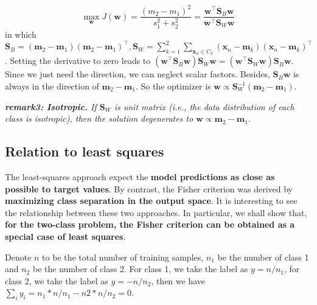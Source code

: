 \documentclass{article}
\begin{document}
	
	\begin{equation}
	\max_\mathbf{w} J(\mathbf{w}) = \frac{(m_2-m_1)^2}{s_1^2+s_2^2} 
	= \frac{\mathbf{w}^\top \mathbf{S}_B \mathbf{w}}{\mathbf{w}^\top \mathbf{S}_W \mathbf{w}}
	\end{equation}
in which $\mathbf{S}_B=(\mathbf{m}_2-\mathbf{m}_1)(\mathbf{m}_2-\mathbf{m}_1)^\top, \mathbf{S}_W=\sum_{k=1}^2\sum_{\mathbf{x}_n\in C_k}(\mathbf{x}_n-\mathbf{m}_k)(\mathbf{x}_n-\mathbf{m}_k)^\top$. Setting the derivative to zero leads to $(\mathbf{w}^\top \mathbf{S}_B \mathbf{w}) \mathbf{S}_W \mathbf{w} = (\mathbf{w}^\top \mathbf{S}_W \mathbf{w}) \mathbf{S}_B \mathbf{w}$. Since we just need the direction, we can neglect scalar factors. Besides,  $\mathbf{S}_B \mathbf{w}$ is always in the direction of $\mathbf{m}_2 - \mathbf{m}_1$. So the optimizer is $\mathbf{w}\propto \mathbf{S}_W^{-1} (\mathbf{m}_2-\mathbf{m}_1)$.
	
	\begin{framed}
	\begin{scriptsize}
	\begin{spacing}{1.2}
	\noindent\textit{\textbf{remark3: Isotropic.} If $\mathbf{S}_W$ is unit matrix (i.e., the data distribution of each class is isotropic), then the solution degenerates to $	\mathbf{w}\propto \mathbf{m}_2-\mathbf{m}_1$.} 

	\end{spacing}
	\end{scriptsize}
	\end{framed}
	
\subsection{Relation to least squares}

	The least-squares approach expect the \textbf{model predictions as close as possible to target values}. By contrast, the Fisher criterion was derived by \textbf{maximizing class separation in the output space}. It is interesting to see the relationship between these two approaches. In particular, we shall show that, \textbf{for the two-class problem, the Fisher criterion can be obtained as a special case of least squares}.

	Denote $n$ to be the total number of training samples, $n_1$ be the number of class 1 and $n_2$ be the number of class 2. For class 1, we take the label as $y=n/n_1$, for class 2, we take the label as $y=-n/n_2$, then we have $\sum_i y_i = n_1 * n / n_1 - n2 * n / n_2 = 0$.
	
\end{document}
